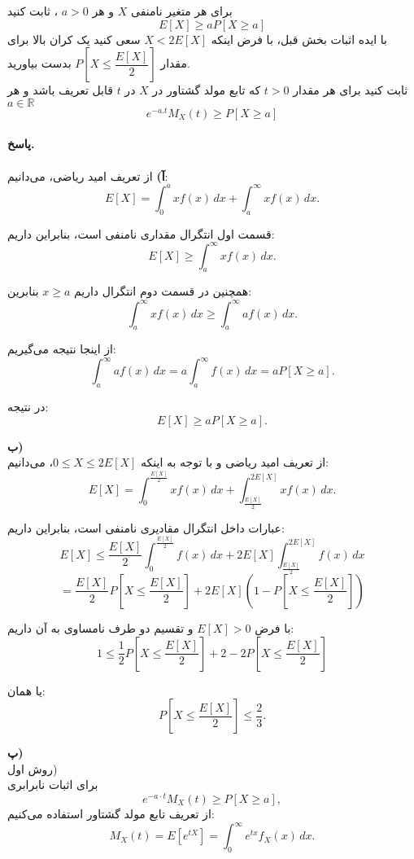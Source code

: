 \problem{}
\subproblem{}
برای هر متغیر نامنفی $X$ و هر $a > 0$ ،
ثابت کنید\\
\[E[X] \geq aP[X\geq a]\]
\subproblem{}
با ایده اثبات بخش قبل، با فرض اینکه $X<2E[X]$
سعی کنید یک کران بالا برای مقدار $P[X \leq \dfrac{E[X]}{2}]$
بدست بیاورید.\\
\subproblem{}
ثابت کنید برای هر مقدار $t > 0$ که تابع مولد گشتاور در $X$
در $t$
قابل تعریف باشد و هر $a \in \mathbb{R}$
\[e^{-a.t}M_X(t) \geq P[X\geq a]\]\\

\textbf{پاسخ.}\\
\\
\textbf{آ)}
از تعریف امید ریاضی، می‌دانیم:
\[
E[X] = \int_0^a x f(x) \, dx + \int_a^\infty x f(x) \, dx.
\]

قسمت اول انتگرال مقداری نامنفی است، بنابراین داریم:
\[
E[X] \geq \int_a^\infty x f(x) \, dx.
\]

همچنین در قسمت دوم انتگرال داریم $x \geq a$ بنابرین:\\
\[
\int_a^\infty x f(x) \, dx \geq \int_a^\infty a f(x) \, dx.
\]

از اینجا نتیجه می‌گیریم:
\[
\int_a^\infty a f(x) \, dx = a \int_a^\infty f(x) \, dx = a P[X \geq a].
\]

در نتیجه:
\[
E[X] \geq a P[X \geq a].
\]


\textbf{ب)}\\

از تعریف امید ریاضی و با توجه به اینکه $0 \leq X \leq 2E[X] $، می‌دانیم:
\[
E[X] = \int_0^{\frac{E[X]}{2}} x f(x) \, dx + \int_{\frac{E[X]}{2}}^{2E[X]} x f(x) \, dx.
\]

عبارات داخل انتگرال مقادیری نامنفی است، بنابراین داریم:
\[
E[X] \leq {\frac{E[X]}{2}} \int_0^{\frac{E[X]}{2}} f(x) \, dx + 2E[X]\int_\frac{E[X]}{2}^{2E[X]} f(x) \, dx
\]
\[
= {\frac{E[X]}{2}} P[X \leq {\frac{E[X]}{2}}] + 2E[X] (1 - P[X \leq {\frac{E[X]}{2}}])
\]

با فرض $E[X] > 0$ و تقسیم دو طرف نامساوی به آن داریم:
\[
    1 \leq \frac{1}{2} P[X \leq {\frac{E[X]}{2}}] + 2 - 2P[X \leq {\frac{E[X]}{2}}]
\]

یا همان:\\
\[
P[X \leq {\frac{E[X]}{2}}] \leq \frac{2}{3} .
\]


\textbf{پ)}\\
روش اول)\\
برای اثبات نابرابری \[e^{-a \cdot t} M_X(t) \geq P[X \geq a],\] از تعریف تابع مولد گشتاور استفاده می‌کنیم:
\[
M_X(t) = E[e^{tX}] = \int_0^\infty e^{tx} f_X(x) \, dx.
\]

